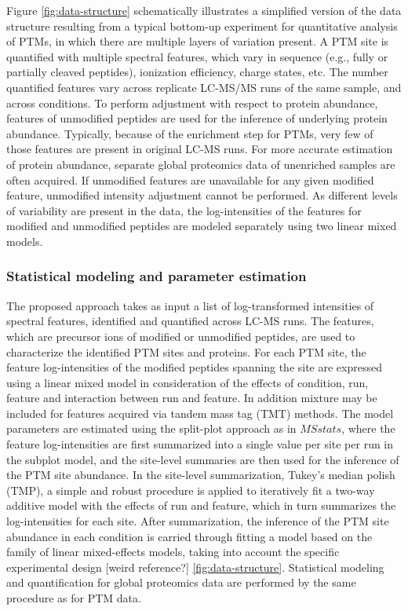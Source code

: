 \documentclass[mcp]{article}
\numberwithin{figure}{section} %
\numberwithin{table}{section}
\def\todo#1{{\color{red}[#1]}}
\begin{document}
Figure \ref{fig:data-structure} schematically illustrates a simplified version of the data structure resulting from a typical bottom-up experiment for quantitative analysis of PTMs, in which there are multiple layers of variation present. A PTM site is quantified with multiple spectral features, which vary in sequence (e.g., fully or partially cleaved peptides), ionization efficiency, charge states, etc. The number quantified features vary across replicate LC-MS/MS runs of the same sample, and across conditions. To perform adjustment with respect to protein abundance, features of unmodified peptides are used for the inference of underlying protein abundance. Typically, because of the enrichment step for PTMs, very few of those features are present in original LC-MS runs. For more accurate estimation of protein abundance, separate global proteomics data of unenriched samples are often acquired. If unmodified features are unavailable for any given modified feature, unmodified intensity adjustment cannot be performed. As different levels of variability are present in the data, the log-intensities of the features for modified and unmodified peptides are modeled separately using two linear mixed models. 

\subsubsection*{Statistical modeling and parameter estimation}

The proposed approach takes as input a list of log-transformed intensities of spectral features, identified and quantified across LC-MS runs. The features, which are precursor ions of modified or unmodified peptides, are used to characterize the identified PTM sites and proteins. For each PTM site, the feature log-intensities of the modified peptides spanning the site are expressed using a linear mixed model in consideration of the effects of condition, run, feature and interaction between run and feature. In addition mixture may be included for features acquired via tandem mass tag (TMT) methods. The model parameters are estimated using the split-plot approach as in $MSstats$, where the feature log-intensities are first summarized into a single value per site per run in the subplot model, and the site-level summaries are then used for the inference of the PTM site abundance.\cite{Choi:2014} In the site-level summarization, Tukey's median polish (TMP), a simple and robust procedure is applied to iteratively fit a two-way additive model with the effects of run and feature, which in turn summarizes the log-intensities for each site.\cite{Tukey:1977} After summarization, the inference of the PTM site abundance in each condition is carried through fitting a model based on the family of linear mixed-effects models, taking into account the specific experimental design \todo{weird reference?} \ref{fig:data-structure}.\cite{Bolker2009} \cite{Faraway:2006} Statistical modeling and quantification for global proteomics data are performed by the same procedure as for PTM data.
\end{document}
